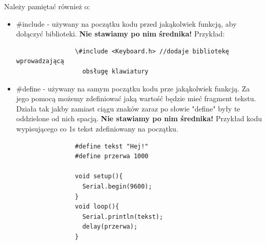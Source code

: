 \documentclass[a4paper,12pt, twoside]{article}
\begin{document}
	Należy pamiętać również o:
	\begin{itemize}
		\item \#include - używany na początku kodu przed jakąkolwiek funkcją, aby dołączyć biblioteki. \textbf{Nie stawiamy po nim średnika!} Przykład:
			\begin{verbatim}
				\#include <Keyboard.h> //dodaje bibliotekę wprowadzającą
				  obsługę klawiatury
			\end{verbatim}
		\item \#define - używany na samym początku kodu prze jakąkolwiek funkcją. Za jego pomocą możemy zdefiniować jaką wartość będzie mieć fragment tekstu.
		Działa tak jakby zamiast ciągu znaków zaraz po słowie "define" były te oddzielone od nich spacją. \textbf{Nie stawiamy po nim średnika!} Przykład kodu wypisującego co 1s tekst zdefiniowany na początku.
			\begin{verbatim}
				#define tekst "Hej!"
				#define przerwa 1000
				
				void setup(){
				  Serial.begin(9600);
				}
				void loop(){
				  Serial.println(tekst);
				  delay(przerwa);
				}
			\end{verbatim}
	\end{itemize}
\end{document}
